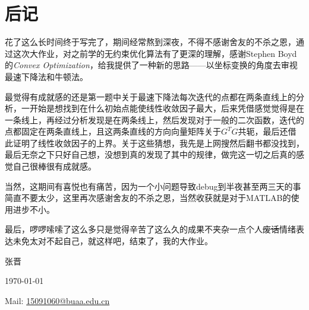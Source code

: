 \newpage

\section{后记}

花了这么长时间终于写完了，期间经常熬到深夜，不得不感谢舍友的不杀之恩，通过这次大作业，对之前学的无约束优化算法有了更深的理解，感谢Stephen Boyd的\emph{Convex Optimization}，给我提供了一种新的思路——以坐标变换的角度去审视最速下降法和牛顿法。

最觉得有成就感的还是第一题中关于最速下降法每次迭代的点都在两条直线上的分析，一开始是想找到在什么初始点能使线性收敛因子最大，后来凭借感觉觉得是在一条线上，再经过分析发现是在两条线上，然后发现对于一般的二次函数，迭代的点都固定在两条直线上，且这两条直线的方向向量矩阵关于$G^TG$共轭，最后还借此证明了线性收敛因子的上界。关于这些猜想，我先是上网搜然后翻书都没找到，最后无奈之下只好自己想，没想到真的发现了其中的规律，做完这一切之后真的感觉自己很棒很有成就感。

当然，这期间有喜悦也有痛苦，因为一个小问题导致debug到半夜甚至两三天的事简直不要太少，这里再次感谢舍友的不杀之恩，当然收获就是对于MATLAB的使用进步不小。

最后，啰啰嗦嗦了这么多只是觉得辛苦了这么久的成果不夹杂一点个人\sout{废话}情绪表达未免太对不起自己，就这样吧，结束了，我的大作业。

\vspace{3ex}

\begin{flushright}
张晋

\today

Mail: \href{15091060@buaa.edu.cn}{15091060@buaa.edu.cn}
\end{flushright}
